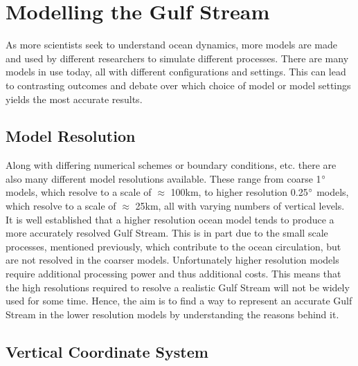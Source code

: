 \documentclass[..\EOYR.tex]{subfiles}
\begin{document}
\section{Modelling the Gulf Stream}
\label{SEC:ModellingGulfStream}

As more scientists seek to understand ocean dynamics, more models are made and used by different researchers to simulate different processes. There are many models in use today, all with different configurations and settings. This can lead to contrasting outcomes and debate over which choice of model or model settings yields the most accurate results.

\subsection{Model Resolution}
\label{SSEC:ModelResolution}

	Along with differing numerical schemes or boundary conditions, etc. there are also many different model resolutions available. These range from coarse 1$\degree$ models, which resolve to a scale of $\approx$ 100km, to higher resolution 0.25$\degree$ models, which resolve to a scale of $\approx$ 25km, all with varying numbers of vertical levels. It is well established \citep{Scaife2011a}\citep{Hurlburt2008} that a higher resolution ocean model tends to produce a more accurately resolved Gulf Stream. This is in part due to the small scale processes, mentioned previously, which contribute to the ocean circulation, but are not resolved in the coarser models. Unfortunately higher resolution models require additional processing power and thus additional costs. This means that the high resolutions required to resolve a realistic Gulf Stream will not be widely used for some time. Hence, the aim is to find a way to represent an accurate Gulf Stream in the lower resolution models by understanding the reasons behind it.

\subsection{Vertical Coordinate System}
\label{SSEC:VerticalCoordinates}
\end{document}
